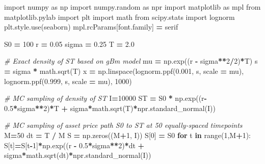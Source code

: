 \documentclass[
]{book}
\newenvironment{Shaded}{\begin{snugshade}}{\end{snugshade}}
\newcommand{\BuiltInTok}[1]{#1}
\newcommand{\CommentTok}[1]{\textcolor[rgb]{0.56,0.35,0.01}{\textit{#1}}}
\newcommand{\ControlFlowTok}[1]{\textcolor[rgb]{0.13,0.29,0.53}{\textbf{#1}}}
\newcommand{\DecValTok}[1]{\textcolor[rgb]{0.00,0.00,0.81}{#1}}
\newcommand{\FloatTok}[1]{\textcolor[rgb]{0.00,0.00,0.81}{#1}}
\newcommand{\ImportTok}[1]{#1}
\newcommand{\KeywordTok}[1]{\textcolor[rgb]{0.13,0.29,0.53}{\textbf{#1}}}
\newcommand{\NormalTok}[1]{#1}
\newcommand{\OperatorTok}[1]{\textcolor[rgb]{0.81,0.36,0.00}{\textbf{#1}}}
\newcommand{\StringTok}[1]{\textcolor[rgb]{0.31,0.60,0.02}{#1}}
\begin{document}
\begin{Shaded}
\begin{Highlighting}[]
\ImportTok{import}\NormalTok{ numpy }\ImportTok{as}\NormalTok{ np}
\ImportTok{import}\NormalTok{ numpy.random }\ImportTok{as}\NormalTok{ npr}
\ImportTok{import}\NormalTok{ matplotlib }\ImportTok{as}\NormalTok{ mpl}
\ImportTok{from}\NormalTok{ matplotlib.pylab }\ImportTok{import}\NormalTok{ plt }
\ImportTok{import}\NormalTok{ math}
\ImportTok{from}\NormalTok{ scipy.stats }\ImportTok{import}\NormalTok{ lognorm}
\NormalTok{plt.style.use(}\StringTok{\textquotesingle{}seaborn\textquotesingle{}}\NormalTok{)}
\NormalTok{mpl.rcParams[}\StringTok{\textquotesingle{}font.family\textquotesingle{}}\NormalTok{] }\OperatorTok{=} \StringTok{\textquotesingle{}serif\textquotesingle{}}


\NormalTok{S0 }\OperatorTok{=} \DecValTok{100}
\NormalTok{r }\OperatorTok{=} \FloatTok{0.05}
\NormalTok{sigma }\OperatorTok{=} \FloatTok{0.25}
\NormalTok{T }\OperatorTok{=} \FloatTok{2.0}

\CommentTok{\# Exact density of ST based on gBm model}
\NormalTok{mu }\OperatorTok{=}\NormalTok{ np.exp((r }\OperatorTok{{-}}\NormalTok{ sigma}\OperatorTok{**}\DecValTok{2}\OperatorTok{/}\DecValTok{2}\NormalTok{)}\OperatorTok{*}\NormalTok{T)}
\NormalTok{s }\OperatorTok{=}\NormalTok{ sigma }\OperatorTok{*}\NormalTok{ math.sqrt(T)}
\NormalTok{x }\OperatorTok{=}\NormalTok{ np.linspace(lognorm.ppf(}\FloatTok{0.001}\NormalTok{, s, scale }\OperatorTok{=}\NormalTok{ mu), lognorm.ppf(}\FloatTok{0.999}\NormalTok{, s, scale }\OperatorTok{=}\NormalTok{ mu), }\DecValTok{1000}\NormalTok{)}


\CommentTok{\# MC sampling of density of ST}
\NormalTok{I}\OperatorTok{=}\DecValTok{10000}
\NormalTok{ST }\OperatorTok{=}\NormalTok{ S0 }\OperatorTok{*}\NormalTok{ np.exp((r}\OperatorTok{{-}}\FloatTok{0.5}\OperatorTok{*}\NormalTok{sigma}\OperatorTok{**}\DecValTok{2}\NormalTok{)}\OperatorTok{*}\NormalTok{T }\OperatorTok{+}\NormalTok{ sigma}\OperatorTok{*}\NormalTok{math.sqrt(T)}\OperatorTok{*}\NormalTok{npr.standard\_normal(I))}


\CommentTok{\# MC sampling of asset price path S0 to ST at 50 equally{-}spaced timepoints}
\NormalTok{M}\OperatorTok{=}\DecValTok{50}
\NormalTok{dt }\OperatorTok{=}\NormalTok{ T }\OperatorTok{/}\NormalTok{ M}
\NormalTok{S }\OperatorTok{=}\NormalTok{ np.zeros((M}\OperatorTok{+}\DecValTok{1}\NormalTok{, I))}
\NormalTok{S[}\DecValTok{0}\NormalTok{] }\OperatorTok{=}\NormalTok{ S0}
\ControlFlowTok{for}\NormalTok{ t }\KeywordTok{in} \BuiltInTok{range}\NormalTok{(}\DecValTok{1}\NormalTok{,M}\OperatorTok{+}\DecValTok{1}\NormalTok{):}
\NormalTok{    S[t]}\OperatorTok{=}\NormalTok{S[t}\OperatorTok{{-}}\DecValTok{1}\NormalTok{]}\OperatorTok{*}\NormalTok{np.exp((r }\OperatorTok{{-}} \FloatTok{0.5}\OperatorTok{*}\NormalTok{sigma}\OperatorTok{**}\DecValTok{2}\NormalTok{)}\OperatorTok{*}\NormalTok{dt }\OperatorTok{+}\NormalTok{ sigma}\OperatorTok{*}\NormalTok{math.sqrt(dt)}\OperatorTok{*}\NormalTok{npr.standard\_normal(I))}



\end{Highlighting}
\end{Shaded}
\end{document}
